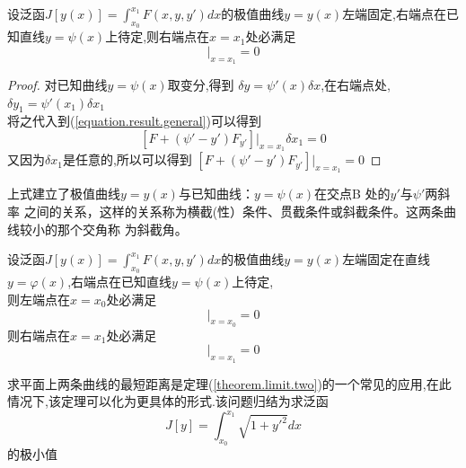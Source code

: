 \documentclass{article}
\begin{document}
\begin{theorem}
设泛函$J[y(x)]=\int_{x_0}^{x_1}F(x,y,y')dx$的极值曲线$y=y(x)$左端固定,右端点在已知直线$y=\psi(x)$上待定,则右端点在$x=x_1$处必满足
\begin{equation}
[F + (\psi' - y')F_{y'}]|_{x=x_1}=0
\end{equation}
\end{theorem}
\begin{proof}
 对已知曲线$y=\psi(x)$取变分,得到 $\delta y=\psi'(x)\delta x$,在右端点处,$\delta y_1=\psi'(x_1)\delta x_1$ \\
将之代入到(\ref{equation.result.general})可以得到
$$
[F + (\psi' - y')F_{y'}]|_{x=x_1}\delta x_1=0
$$
又因为$\delta x_1$是任意的,所以可以得到
$[F + (\psi' - y')F_{y'}]|_{x=x_1}=0$
\end{proof}
上式建立了极值曲线$y = y ( x )$与已知曲线：$y = \psi(x)$在交点B 处的$y'$与$\psi'$两斜率
之间的关系，这样的关系称为横截(性）条件、贯截条件或斜截条件。这两条曲线较小的那个交角称
为斜截角。

\begin{theorem}
\label{theorem.limit.two}
设泛函$J[y(x)]=\int_{x_0}^{x_1}F(x,y,y')dx$的极值曲线$y=y(x)$左端固定在直线$y=\varphi(x)$,右端点在已知直线$y=\psi(x)$上待定,\\
则左端点在$x=x_0$处必满足
\begin{equation}
[F + (\varphi' - y')F_{y'}]|_{x=x_0}=0
\end{equation}
则右端点在$x=x_1$处必满足
\begin{equation}
[F + (\psi' - y')F_{y'}]|_{x=x_1}=0
\end{equation}
\end{theorem}
求平面上两条曲线的最短距离是定理(\ref{theorem.limit.two})的一个常见的应用,在此情况下,该定理可以化为更具体的形式.该问题归结为求泛函
$$J[y]=\int_{x_0}^{x_1}\sqrt{1+y'^2}dx$$的极小值
\end{document}
